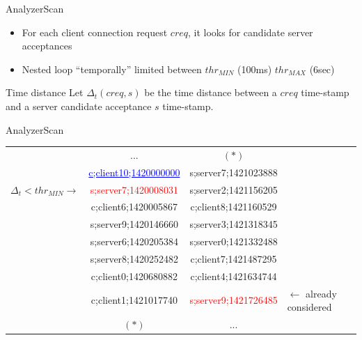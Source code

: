 	\begin{frame}{Analyzer}{Scan}
		\begin{itemize}
		 \item For each client connection request $creq$, it looks for candidate
server acceptances
		\item Nested loop ``temporally'' limited between $thr_{MIN}$ (100ms)
$thr_{MAX}$ (6sec)
	\end{itemize}	
	\begin{block}{Time distance}
		Let $\Delta_t(creq, s)$ be the time distance between a $creq$
time-stamp and a server candidate acceptance $s$ time-stamp.
	\end{block}
	
	\end{frame}	
	
	\begin{frame}{Analyzer}{Scan}
		
			\begin{tabular}{ r c | c l }
			&... &$(*)$ &\\
 
			&\textcolor{blue}{\underline{c;client10;1420000000}}&
			s;server7;1421023888&\\
			
			\scriptsize $\Delta_t < thr_{MIN}\to$ &
			\textcolor{red}{s;server7;1420008031}&
			\textcolor{green!90!red!85!blue!85}{s;server2;1421156205}&\\
			
			&c;client6;1420005867&
			c;client8;1421160529&\\
			
			&\textcolor{green!90!red!85!blue!85}{s;server9;1420146660}&
			\textcolor{green!90!red!85!blue!85}	{s;server3;1421318345}&\\
		
			&\textcolor{green!90!red!85!blue!85}{s;server6;1420205384}&
			\textcolor{green!90!red!85!blue!85}{s;server0;1421332488}&\\
		
			&\textcolor{green!90!red!85!blue!85}{s;server8;1420252482}&
			c;client7;1421487295&\\
			
			&c;client0;1420680882&
			c;client4;1421634744&\\
			
			&c;client1;1421017740&
			\textcolor{red}{s;server9;1421726485}&  \scriptsize $\gets$ already
considered\\
			
			&$(*)$  & ... &\\
			\end{tabular}
	\end{frame}

